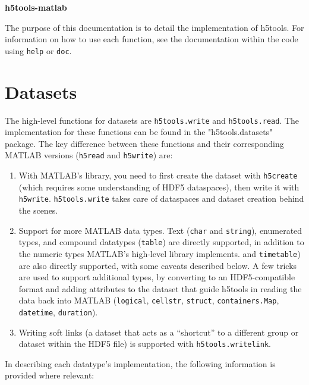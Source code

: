 \documentclass[11pt]{exam}
\newcommand\myfcn[1]{\colorbox{codegray}{\textcolor{codeblue}{\texttt{#1}}}}
\newcommand\matfcn[1]{\textcolor{darkteal}{\texttt{#1}}}
\begin{document}
	\begin{center}
		\textbf{\Huge h5tools-matlab}
	\end{center}

	\noindent The purpose of this documentation is to detail the implementation of h5tools. For information on how to use each function, see the documentation within the code using \texttt{help} or \texttt{doc}. 
    \section{Datasets}
        \noindent The high-level functions for datasets are \myfcn{h5tools.write} and \myfcn{h5tools.read}. The implementation for these functions can be found in the "h5tools.datasets" package. The key difference between these functions and their corresponding MATLAB versions (\matfcn{h5read} and \matfcn{h5write}) are:
        \begin{enumerate}
            \item With MATLAB's library, you need to first create the dataset with \myfcn{h5create} (which requires some understanding of HDF5 dataspaces), then write it with \matfcn{h5write}. \myfcn{h5tools.write} takes care of dataspaces and dataset creation behind the scenes. 
            \item Support for more MATLAB data types. Text (\texttt{char} and \texttt{string}), enumerated types, and compound datatypes (\texttt{table}) are directly supported, in addition to the numeric types MATLAB's high-level library implements.  and \texttt{timetable}) are also directly supported, with some caveats described below. A few tricks are used to support additional types, by converting to an HDF5-compatible format and adding attributes to the dataset that guide h5tools in reading the data back into MATLAB (\texttt{logical}, \texttt{cellstr}, \texttt{struct}, \texttt{containers.Map}, \texttt{datetime}, \texttt{duration}).  
            \item Writing soft links (a dataset that acts as a ``shortcut'' to a different group or dataset within the HDF5 file) is supported with \myfcn{h5tools.writelink}.
        \end{enumerate}
        $\quad$\\
        \noindent In describing each datatype's implementation, the following information is provided where relevant:
\end{document}
